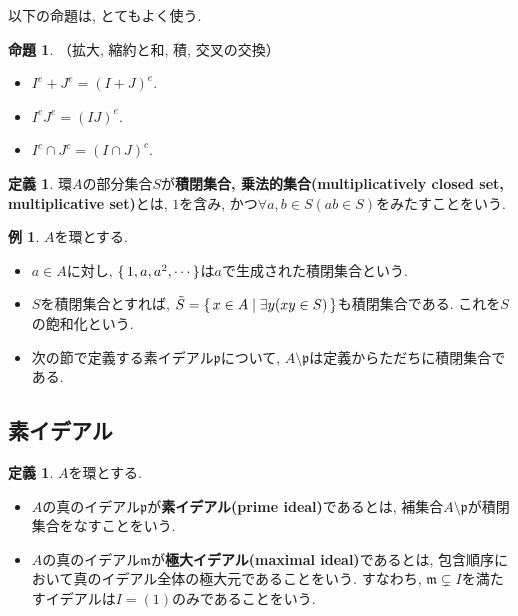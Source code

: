 \documentclass[a4paper, twoside]{bxjsarticle}
\newcommand{\mf}{\mathfrak}
\newcommand{\tb}{\textbf}
\theoremstyle{definition}
\newtheorem{prop}[thm]{命題}
\newtheorem{defn}[thm]{定義}
\newtheorem{exm}[thm]{例}
\begin{document}
        以下の命題は, とてもよく使う.
        \begin{prop}（拡大, 縮約と和, 積, 交叉の交換）
            \begin{itemize}
                \item $I^e + J^e = (I+J)^e$.
                \item $I^eJ^e = (IJ)^e$.
                \item $I^c \cap J^c = (I\cap J)^c$.
            \end{itemize}
        \end{prop}
        \begin{defn}
            環$A$の部分集合$S$が\tb{積閉集合, 乗法的集合(multiplicatively closed set, multiplicative set)}とは, $1$を含み, かつ$\forall a, b\in S(ab\in S)$をみたすことをいう.
        \end{defn}
        \begin{exm}
            $A$を環とする.

            \begin{itemize}
                \item $a\in A$に対し, $\set{1, a, a^2,\cdots}$は$a$で生成された積閉集合という.
                \item $S$を積閉集合とすれば, $\tilde{S}=\set{x\in A|\exists y (xy\in S)}$も積閉集合である. これを$S$の飽和化という.
                \item 次の節で定義する素イデアル$\mf{p}$について, $A\setminus\mf{p}$は定義からただちに積閉集合である.
            \end{itemize}
        \end{exm}

        \subsection{素イデアル}
        \begin{defn}
            $A$を環とする. 

            \begin{itemize}
                \item $A$の真のイデアル$\mf{p}$が\tb{素イデアル(prime ideal)}であるとは, 補集合$A\setminus \mf{p}$が積閉集合をなすことをいう.
                
                \item $A$の真のイデアル$\mf{m}$が\tb{極大イデアル(maximal ideal)}であるとは, 包含順序において真のイデアル全体の極大元であることをいう. すなわち, $\mf{m}\subsetneq I$を満たすイデアルは$I=(1)$のみであることをいう.
            \end{itemize}
            
        \end{defn}
    
\end{document}
